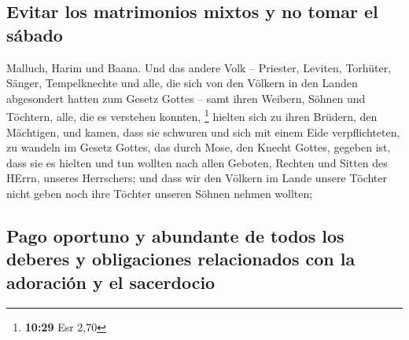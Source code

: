 \hypertarget{evitar-los-matrimonios-mixtos-y-no-tomar-el-suxe1bado}{%
\subsection{Evitar los matrimonios mixtos y no tomar el
sábado}\label{evitar-los-matrimonios-mixtos-y-no-tomar-el-suxe1bado}}

 Malluch, Harim und Baana.  Und das andere
Volk -- Priester, Leviten, Torhüter, Sänger, Tempelknechte und alle, die
sich von den Völkern in den Landen abgesondert hatten zum Gesetz Gottes
-- samt ihren Weibern, Söhnen und Töchtern, alle, die es verstehen
konnten, \footnote{\textbf{10:29} Esr 2,70}  hielten sich
zu ihren Brüdern, den Mächtigen, und kamen, dass sie schwuren und sich
mit einem Eide verpflichteten, zu wandeln im Gesetz Gottes, das durch
Mose, den Knecht Gottes, gegeben ist, dass sie es hielten und tun
wollten nach allen Geboten, Rechten und Sitten des HErrn, unseres
Herrschers;  und dass wir den Völkern im Lande unsere
Töchter nicht geben noch ihre Töchter unseren Söhnen nehmen wollten;

\hypertarget{pago-oportuno-y-abundante-de-todos-los-deberes-y-obligaciones-relacionados-con-la-adoraciuxf3n-y-el-sacerdocio}{%
\subsection{Pago oportuno y abundante de todos los deberes y
obligaciones relacionados con la adoración y el
sacerdocio}\label{pago-oportuno-y-abundante-de-todos-los-deberes-y-obligaciones-relacionados-con-la-adoraciuxf3n-y-el-sacerdocio}}

